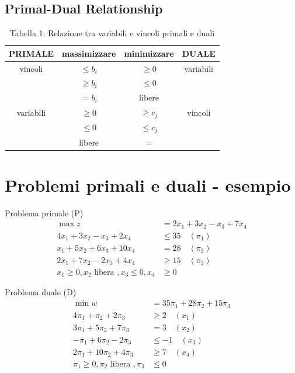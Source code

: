 \documentclass[a4paper, 11pt]{article}
\begin{document}
    \subsection{Primal-Dual Relationship}
        \begin{table}[h!]
            \centering
            \begin{tabular}{|c|c||c|c|}
            \hline
            PRIMALE & massimizzare & minimizzare & DUALE \\
            \hline
            vincoli & $\leq b_i$ & $\geq 0$ & variabili \\
             & $\geq b_i$ & $\leq 0$ & \\
             & $= b_i$ & libere & \\
            \hline
            variabili & $\geq 0$ & $\geq c_j$ & vincoli \\
             & $\leq 0$ & $\leq c_j$ & \\
             & libere & $=$ & \\
            \hline
            \end{tabular}
            \caption{Tabella 1: Relazione tra variabili e vincoli primali e duali}
        \end{table}
















        
        \section*{Problemi primali e duali - esempio}
        Problema primale (P)
        \begin{align*}
            \max z &= 2x_1 + 3x_2 - x_3 + 7x_4 \\
            4x_1 + 3x_2 - x_3 + 2x_4 &\leq 35 \quad (\pi_1) \\
            x_1 + 5x_2 + 6x_3 + 10x_4 &= 28 \quad (\pi_2) \\
            2x_1 + 7x_2 - 2x_3 + 4x_4 &\geq 15 \quad (\pi_3) \\
            x_1 \geq 0, x_2 \text{ libera }, x_3 \leq 0, x_4 &\geq 0
        \end{align*}
        
        Problema duale (D)
        \begin{align*}
            \min w &= 35\pi_1 + 28\pi_2 + 15\pi_3 \\
            4\pi_1 + \pi_2 + 2\pi_3 &\geq 2 \quad (x_1) \\
            3\pi_1 + 5\pi_2 + 7\pi_3 &= 3 \quad (x_2) \\
            -\pi_1 + 6\pi_2 - 2\pi_3 &\leq -1 \quad (x_3) \\
            2\pi_1 + 10\pi_2 + 4\pi_3 &\geq 7 \quad (x_4) \\
            \pi_1 \geq 0, \pi_2 \text{ libera }, \pi_3 &\leq 0
        \end{align*}
        
\end{document}

